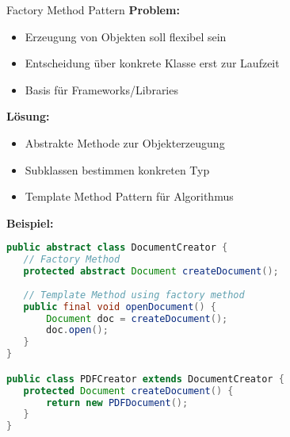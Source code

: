 \begin{definition}{Factory Method Pattern}
\textbf{Problem:}
\begin{itemize}
   \item Erzeugung von Objekten soll flexibel sein
   \item Entscheidung über konkrete Klasse erst zur Laufzeit
   \item Basis für Frameworks/Libraries
\end{itemize}

\textbf{Lösung:}
\begin{itemize}
   \item Abstrakte Methode zur Objekterzeugung
   \item Subklassen bestimmen konkreten Typ
   \item Template Method Pattern für Algorithmus
\end{itemize}

\textbf{Beispiel:}
\begin{lstlisting}[language=Java, style=basesmol]
public abstract class DocumentCreator {
   // Factory Method
   protected abstract Document createDocument();
   
   // Template Method using factory method
   public final void openDocument() {
       Document doc = createDocument();
       doc.open();
   }
}

public class PDFCreator extends DocumentCreator {
   protected Document createDocument() {
       return new PDFDocument();
   }
}
\end{lstlisting}
\end{definition}

